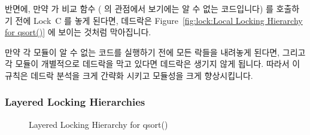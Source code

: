 반면에, 만약  가 비교 함수 ( 의 관점에서 보기에는 알 수
없는 코드입니다) 를 호출하기 전에 Lock~C 를 놓게 된다면, 데드락은
Figure~\ref{fig:lock:Local Locking Hierarchy for qsort()} 에 보이는 것처럼
막아집니다.

만약 각 모듈이 알 수 없는 코드를 실행하기 전에 모든 락들을 내려놓게 된다면,
그리고 각 모듈이 개별적으로 데드락을 막고 있다면 데드락은 생기지 않게 됩니다.
따라서 이 규칙은 데드락 분석을 크게 간략화 시키고 모듈성을 크게 향상시킵니다.

\subsubsection{Layered Locking Hierarchies}
\label{sec:locking:Layered Locking Hierarchies}

\begin{figure}[tb]
\begin{center}
\end{center}
\caption{Layered Locking Hierarchy for qsort()}
\label{fig:lock:Layered Locking Hierarchy for qsort()}
\end{figure}

